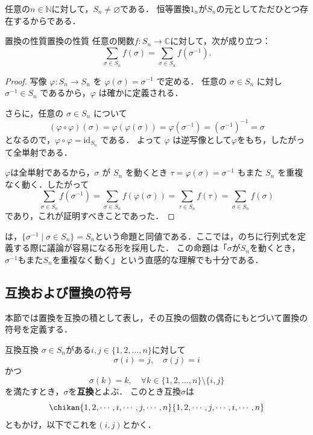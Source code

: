 \begin{remark}[$S_n$は空でない]
  任意の$n \in \mathbb{N}$に対して，$S_n \ne \varnothing$である．
  恒等置換$1_n$が$S_n$の元としてただひとつ存在するからである．
\end{remark}

\begin{prop}{置換の性質}{置換の性質}
  任意の関数$ f \colon S_n \to \mathbb{C} $に対して，次が成り立つ：
  \[
  \sum_{\sigma \in S_n} f(\sigma) = \sum_{\sigma \in S_n} f(\sigma^{-1}).
  \]
\end{prop}

\begin{leftbar}
\begin{proof}
  写像 $\varphi \colon S_n \to S_n$ を $\varphi(\sigma)=\sigma^{-1}$ で定める．
  任意の $\sigma \in S_n$ に対し $\sigma^{-1}\in S_n$ であるから，$\varphi$ は確かに定義される．

  さらに，任意の $\sigma \in S_n$ について
  \[
    (\varphi \circ \varphi)(\sigma) =\varphi (\varphi(\sigma)) 
    =\varphi (\sigma^{-1}) 
    =(\sigma^{-1})^{-1} 
    =\sigma
  \]
  となるので，$\varphi \circ\varphi=\mathrm{id}_{S_n}$ である．
  よって $\varphi$ は逆写像として$\varphi$をもち，したがって全単射である．

  $\varphi$は全単射であるから，$\sigma$ が $S_n$ を動くとき $\tau=\varphi(\sigma)=\sigma^{-1}$ もまた
  $S_n$ を重複なく動く．したがって
  \[
    \sum_{\sigma\in S_n} f(\sigma^{-1}) 
    =\sum_{\sigma\in S_n} f(\varphi(\sigma)) 
    =\sum_{\tau\in S_n} f(\tau) 
    =\sum_{\sigma\in S_n} f(\sigma)
  \]
  であり，これが証明すべきことであった．
\end{proof}
\end{leftbar}

は，$\{ \sigma^{-1} \mid \sigma \in S_n \} = S_n$という命題と同値である．ここでは，のちに行列式を定義する際に議論が容易になる形を採用した．
この命題は「$\sigma$が$S_n$を動くとき，$\sigma^{-1}$もまた$S_n$を重複なく動く」という直感的な理解でも十分である．

\subsection{互換および置換の符号}

本節では置換を互換の積として表し，その互換の個数の偶奇にもとづいて置換の符号を定義する．


\begin{definition}{互換}{互換}
  $\sigma \in S_n$がある$i, j \in \{1, 2, \dots, n\}$に対して
  \[
  \sigma(i) = j, \quad \sigma(j) = i
  \]
  かつ
  \[
  \sigma(k) = k, \quad \forall k \in \{1, 2, \dots, n\} \setminus \{i, j\}
  \]
  を満たすとき，$\sigma$を\textbf{互換}とよぶ． このとき互換$\sigma$は
  \[
  \chikan{1, 2, \cdots, i, \cdots, j, \cdots, n}{1, 2, \cdots, j, \cdots, i, \cdots, n}
  \]
  ともかけ，以下でこれを$(i,j)$とかく．
\end{definition}

